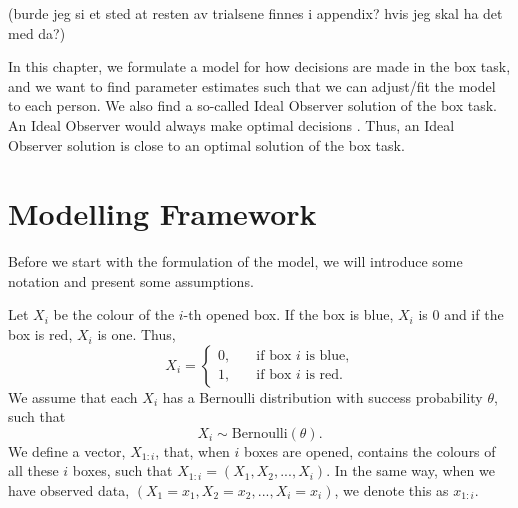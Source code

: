 (burde jeg si et sted at resten av trialsene finnes i appendix? hvis jeg skal ha det med da?)

In this chapter, we formulate a model for how decisions are made in the box task, and we want to find parameter estimates such that we can adjust/fit the model to each person. We also find a so-called Ideal Observer solution of the box task. An Ideal Observer would always make optimal decisions \citep{idealObs}. Thus, an Ideal Observer solution is close to an optimal solution of the box task. 



\section{Modelling Framework}
Before we start with the formulation of the model, we will introduce some notation and present some assumptions. 

\label{section_notation}
Let $X_i$ be the colour of the $i$-th opened box. If the box is blue, $X_i$ is 0 and if the box is red, $X_i$ is one. Thus,
\begin{equation*}
    X_i = \begin{cases}
    0,& \quad \text{if box } i \text{ is blue,}\\
    1,& \quad \text{if box } i \text{ is red.}
    \end{cases}
\end{equation*}
We assume that each $X_i$ has a Bernoulli distribution with success probability $\theta$, such that
\begin{equation*}
    X_i \sim \text{Bernoulli}(\theta).
\end{equation*}
We define a vector, $X_{1:i}$, that, when $i$ boxes are opened,
contains the colours of all these $i$ boxes, such that $X_{1:i} = (X_1,X_2,...,X_{i})$. In the same way, when we have observed data, $(X_1=x_1,X_2=x_2,...,X_i=x_i)$, we denote this as $x_{1:i}$.

